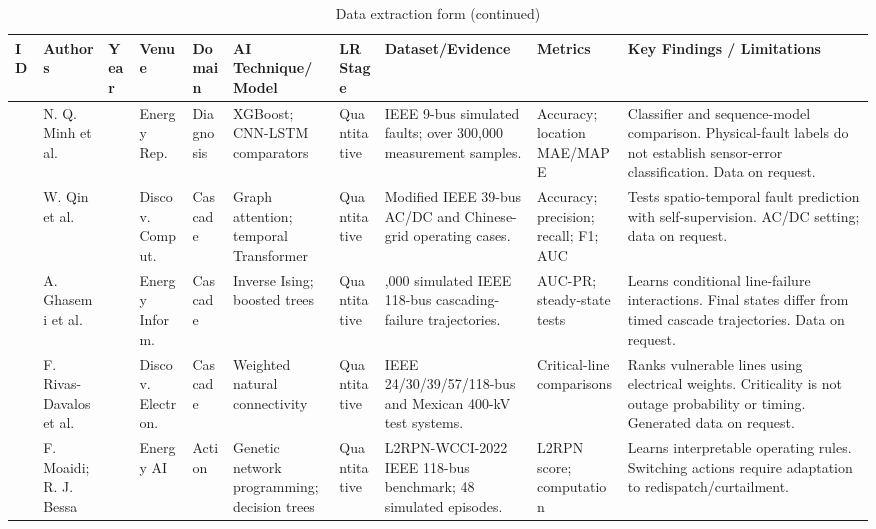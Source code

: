 \begin{table}[!t]
\addtocounter{table}{-1}\renewcommand{\theHtable}{continued.\arabic{table}}
\caption{Data extraction form (continued)}
\centering\fontsize{8}{9.3}\selectfont\setlength{\tabcolsep}{2pt}
\begin{tabular}{>{\raggedright\arraybackslash}p{18pt}>{\raggedright\arraybackslash}p{40pt}>{\raggedright\arraybackslash}p{24pt}>{\raggedright\arraybackslash}p{45pt}>{\raggedright\arraybackslash}p{38pt}>{\raggedright\arraybackslash}p{51pt}>{\raggedright\arraybackslash}p{42pt}>{\raggedright\arraybackslash}p{85pt}>{\raggedright\arraybackslash}p{42pt}>{\raggedright\arraybackslash}p{91pt}}\toprule
ID & Authors & Year & Venue & Domain & AI Technique/Model & LR Stage & Dataset/Evidence & Metrics & Key Findings / Limitations \\ \midrule
\cite{S14} & N. Q. Minh et al. & 2024 & Energy Rep. & Diagnosis & XGBoost; CNN-LSTM comparators & Quantitative & IEEE 9-bus simulated faults; over 300,000 measurement samples. & Accuracy; location MAE/MAPE & Classifier and sequence-model comparison. Physical-fault labels do not establish sensor-error classification. Data on request. \\[4pt]
\cite{N02} & W. Qin et al. & 2026 & Discov. Comput. & Cascade & Graph attention; temporal Transformer & Quantitative & Modified IEEE 39-bus AC/DC and Chinese-grid operating cases. & Accuracy; precision; recall; F1; AUC & Tests spatio-temporal fault prediction with self-supervision. AC/DC setting; data on request. \\[4pt]
\cite{S02} & A. Ghasemi et al. & 2023 & Energy Inform. & Cascade & Inverse Ising; boosted trees & Quantitative & 50,000 simulated IEEE 118-bus cascading-failure trajectories. & AUC-PR; steady-state tests & Learns conditional line-failure interactions. Final states differ from timed cascade trajectories. Data on request. \\[4pt]
\cite{S03} & F. Rivas-Davalos et al. & 2024 & Discov. Electron. & Cascade & Weighted natural connectivity & Quantitative & IEEE 24/30/39/57/118-bus and Mexican 400-kV test systems. & Critical-line comparisons & Ranks vulnerable lines using electrical weights. Criticality is not outage probability or timing. Generated data on request. \\[4pt]
\cite{S08} & F. Moaidi; R. J. Bessa & 2026 & Energy AI & Action & Genetic network programming; decision trees & Quantitative & L2RPN-WCCI-2022 IEEE 118-bus benchmark; 48 simulated episodes.~\cite{GNPDTData} & L2RPN score; computation & Learns interpretable operating rules. Switching actions require adaptation to redispatch/curtailment. \\[4pt]

\end{tabular}
\end{table}
